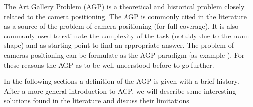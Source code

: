 

The Art Gallery Problem (AGP) is a theoretical and historical problem closely related to the camera positioning. The AGP is commonly cited  in the literature as a source of the problem of camera positioning (for full coverage). It is also commonly used to estimate the complexity of the task (notably due to the room shape) and  as starting point to find an appropriate answer. 
The problem of cameras positioning can be formulate as the AGP paradigm (as example \citep{44*chvatal1975,53*packer2008,149*mavrinac2013}). For these reasons the AGP as to be well understood before to go further.


In the following sections a definition of the AGP is given with a brief history. After a more general introduction to AGP, we will describe some interesting solutions found in the literature and discuss their limitations.



